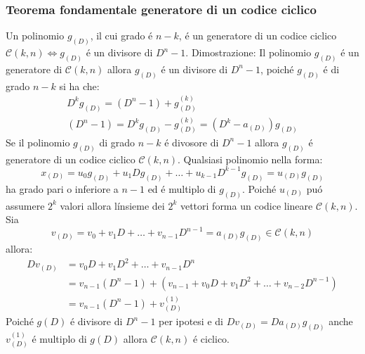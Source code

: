        \subsubsection{Teorema fondamentale generatore di un codice ciclico}
            Un polinomio $g_{(D)}$, il cui grado é $n-k$, é un generatore di un codice ciclico $\mathcal{C}(k,n) \Leftrightarrow g_{(D)}$ é un divisore di 
            $D^n-1$. Dimostrazione:
            Il polinomio $g_{(D)}$ é un generatore di $\mathcal{C}(k,n)$ allora $g_{(D)}$ é un divisore di 
            $D^n-1$, poiché $g_{(D)}$ é di grado $n-k$ si ha che:
            \begin{gather}
                D^kg_{(D)}=(D^n-1)+g^{(k)}_{(D)} \nonumber \\ 
                (D^n-1)=D^kg_{(D)}-g^{(k)}_{(D)} = \left(D^k-a_{(D)}\right)g_{(D)}\nonumber
            \end{gather}
            Se il polinomio $g_{(D)}$ di grado $n-k$ é divosore di $D^n-1$ allora $g_{(D)}$ é generatore di un codice ciclico
            $\mathcal{C}(k,n)$. Qualsiasi polinomio nella forma:
            \[
                x_{(D)} = u_0g_{(D)}+u_1Dg_{(D)}+\dots+u_{k-1}D^{k-1}g_{(D)} = u_{(D)}g_{(D)}  
            \]
            ha grado pari o inferiore a $n-1$ ed é multiplo di $g_{(D)}$. Poiché $u_{(D)}$ puó assumere $2^{k}$ valori
            allora línsieme dei $2^k$ vettori forma un codice lineare $\mathcal{C}(k,n)$. Sia
            \[
                v_{(D)} = v_0+v_1D+\dots+v_{n-1}D^{n-1} = a_{(D)}g_{(D)} \in \mathcal{C}(k,n)  
            \]
            allora:
            \begin{align}
                Dv_{(D)}&= v_0D+v_1D^2+\dots+v_{n-1}D^{n}\nonumber \\
                        &= v_{n-1}(D^{n}-1)+(v_{n-1}+v_0D+v_1D^2+\dots+v_{n-2}D^{n-1})\nonumber \\
                        &= v_{n-1}(D^{n}-1)+v^{(1)}_{(D)}\nonumber
            \end{align}
            Poiché $g{(D)}$ é divisore di $D^n-1$ per ipotesi e di $Dv_{(D)}=Da_{(D)}g_{(D)}$ anche 
            $v^{(1)}_{(D)}$ é multiplo di $g{(D)}$ allora $\mathcal{C}(k,n)$ é ciclico.

